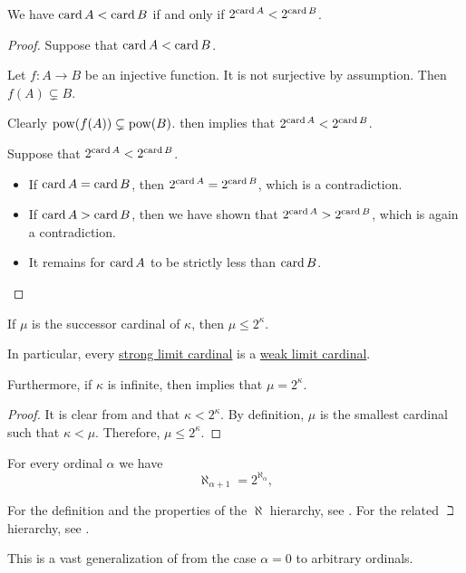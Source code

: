 \begin{corollary}\label{thm:cardinal_exponentiation_comparison}
  We have \( \operatorname{card} A < \operatorname{card} B \) if and only if \( 2^{\operatorname{card} A} < 2^{\operatorname{card} B} \).
\end{corollary}
\begin{proof}
  \SufficiencySubProof Suppose that \( \operatorname{card} A < \operatorname{card} B \).

  Let \( f: A \to B \) be an injective function. It is not surjective by assumption. Then \( f(A) \subsetneq B \).

  Clearly \( \operatorname{pow}(f(A)) \subsetneq \operatorname{pow}(B) \).  then implies that \( 2^{\operatorname{card} A} < 2^{\operatorname{card} B} \).

  \NecessitySubProof Suppose that \( 2^{\operatorname{card} A} < 2^{\operatorname{card} B} \).
  \begin{itemize}
    \item If \( \operatorname{card} A = \operatorname{card} B \), then \( 2^{\operatorname{card} A} = 2^{\operatorname{card} B} \), which is a contradiction.
    \item If \( \operatorname{card} A > \operatorname{card} B \), then we have shown that \( 2^{\operatorname{card} A} > 2^{\operatorname{card} B} \), which is again a contradiction.
    \item It remains for \( \operatorname{card} A \) to be strictly less than \( \operatorname{card} B \).
  \end{itemize}
\end{proof}

\begin{proposition}\label{thm:strong_limit_cardinal_is_weak_limit}
  If \( \mu \) is the successor cardinal of \( \kappa \), then \( \mu \leq 2^\kappa \).

  In particular, every \hyperref[def:successor_and_limit_cardinal/strong_limit]{strong limit cardinal} is a \hyperref[def:successor_and_limit_cardinal/strong_limit]{weak limit cardinal}.

  Furthermore, if \( \kappa \) is infinite, then  implies that \( \mu = 2^\kappa \).
\end{proposition}
\begin{proof}
  It is clear from  and  that \( \kappa < 2^\kappa \). By definition, \( \mu \) is the smallest cardinal such that \( \kappa < \mu \). Therefore, \( \mu \leq 2^\kappa \).
\end{proof}

\begin{conjecture}\label{hyp:generalized_continuum_hypothesis}
  For every ordinal \( \alpha \) we have
  \begin{equation*}
    \aleph_{\alpha + 1} = 2^{\aleph_\alpha},
  \end{equation*}

  For the definition and the properties of the \( \aleph \) hierarchy, see . For the related \( \beth \) hierarchy, see .

  This is a vast generalization of  from the case \( \alpha = 0 \) to arbitrary ordinals.
\end{conjecture}

